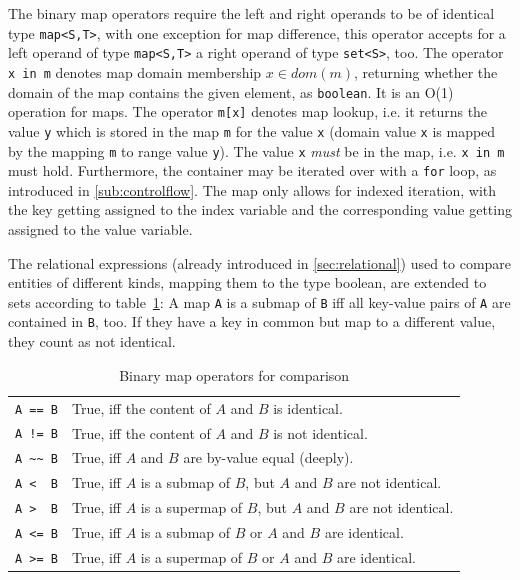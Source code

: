 The binary map operators require the left and right operands to be of identical type \verb#map<S,T>#,
with one exception for map difference, this operator accepts for a left operand of type \verb#map<S,T># a right operand of type \verb#set<S>#, too.
The operator \texttt{x in m} denotes map domain membership $x \in dom(m)$, returning whether the domain of the map contains the given element, as \texttt{boolean}.
It is an O(1) operation for maps.
The operator \texttt{m[x]} denotes map lookup, i.e. it returns the value \texttt{y} which is stored in the map \texttt{m} for the value \texttt{x} (domain value \texttt{x} is mapped by the mapping \texttt{m} to range value \texttt{y}). The value \texttt{x} \emph{must} be in the map, i.e. \texttt{x in m} must hold.
Furthermore, the container may be iterated over with a \texttt{for} loop, as introduced in  \ref{sub:controlflow}.
The map only allows for indexed iteration, with the key getting assigned to the index variable and the corresponding value getting assigned to the value variable.

The relational expressions (already introduced in \ref{sec:relational}) used to compare entities of different kinds, mapping them to the type boolean, are extended to sets according to table~\ref{compmap}:
A map \texttt{A} is a submap of \texttt{B} iff all key-value pairs of \texttt{A} are contained in \texttt{B}, too. If they have a key in common but map to a different value, they count as not identical.

\begin{table}[htbp]
  \centering
  \begin{tabularx}{\linewidth}{|l|X|}
    \hline
    \texttt{A == B} & True, iff the content of $A$ and $B$ is identical. \\
    \texttt{A != B} & True, iff the content of $A$ and $B$ is not identical. \\
    \texttt{A \textasciitilde\textasciitilde\ B} & True, iff $A$ and $B$ are by-value equal (deeply).\\
    \texttt{A <\ \ B} & True, iff $A$ is a submap of $B$, but $A$ and $B$ are not identical. \\
    \texttt{A >\ \ B} & True, iff $A$ is a supermap of $B$, but $A$ and $B$ are not identical. \\
    \texttt{A <= B} & True, iff $A$ is a submap of $B$ or $A$ and $B$ are identical. \\
    \texttt{A >= B} & True, iff $A$ is a supermap of $B$ or $A$ and $B$ are identical. \\
    \hline
  \end{tabularx}
  \caption{Binary map operators for comparison}
  \label{compmap}
\end{table}

